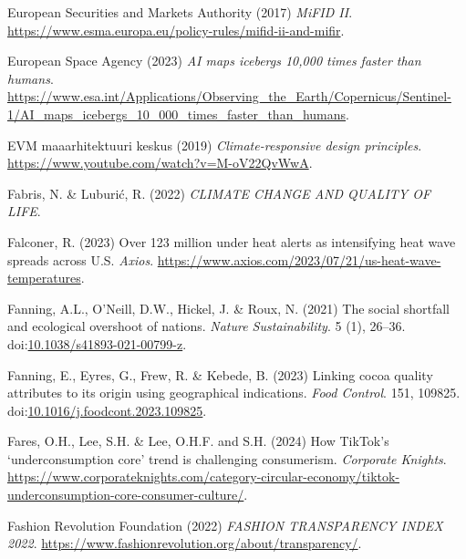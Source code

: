 \documentclass[
  letterpaper,
  DIV=11,
  numbers=noendperiod]{scrartcl}
\newlength{\cslhangindent}
\newenvironment{CSLReferences}[2] %
 {\begin{list}{}{%
  \setlength{\itemindent}{0pt}
  \setlength{\leftmargin}{0pt}
  \setlength{\parsep}{0pt}
  \ifodd #1
   \setlength{\leftmargin}{\cslhangindent}
   \setlength{\itemindent}{-1\cslhangindent}
  \fi
  \setlength{\itemsep}{#2\baselineskip}}}
 {\end{list}}
\begin{document}
\begin{CSLReferences}{0}{1}
European Securities and Markets Authority (2017) \emph{{MiFID II}}.
\url{https://www.esma.europa.eu/policy-rules/mifid-ii-and-mifir}.

European Space Agency (2023) \emph{{AI} maps icebergs 10,000 times
faster than humans}.
\url{https://www.esa.int/Applications/Observing_the_Earth/Copernicus/Sentinel-1/AI_maps_icebergs_10_000_times_faster_than_humans}.

EVM maaarhitektuuri keskus (2019) \emph{Climate-responsive design
principles}. \url{https://www.youtube.com/watch?v=M-oV22QvWwA}.

Fabris, N. \& Luburić, R. (2022) \emph{{CLIMATE CHANGE AND QUALITY OF
LIFE}}.

Falconer, R. (2023) Over 123 million under heat alerts as intensifying
heat wave spreads across {U}.{S}. \emph{Axios}.
\url{https://www.axios.com/2023/07/21/us-heat-wave-temperatures}.

Fanning, A.L., O'Neill, D.W., Hickel, J. \& Roux, N. (2021) The social
shortfall and ecological overshoot of nations. \emph{Nature
Sustainability}. 5 (1), 26--36.
doi:\href{https://doi.org/10.1038/s41893-021-00799-z}{10.1038/s41893-021-00799-z}.

Fanning, E., Eyres, G., Frew, R. \& Kebede, B. (2023) Linking cocoa
quality attributes to its origin using geographical indications.
\emph{Food Control}. 151, 109825.
doi:\href{https://doi.org/10.1016/j.foodcont.2023.109825}{10.1016/j.foodcont.2023.109825}.

Fares, O.H., Lee, S.H. \& Lee, O.H.F. and S.H. (2024) How {TikTok}'s
{`underconsumption core'} trend is challenging consumerism.
\emph{Corporate Knights}.
\url{https://www.corporateknights.com/category-circular-economy/tiktok-underconsumption-core-consumer-culture/}.

Fashion Revolution Foundation (2022) \emph{{FASHION TRANSPARENCY INDEX}
2022}. \url{https://www.fashionrevolution.org/about/transparency/}.


\end{CSLReferences}
\end{document}

